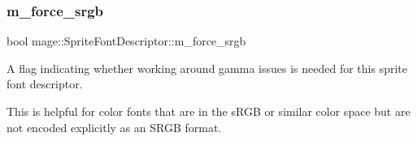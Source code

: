\subsubsection{\texorpdfstring{m\+\_\+force\+\_\+srgb}{m\_force\_srgb}}
{\footnotesize\ttfamily bool mage\+::\+Sprite\+Font\+Descriptor\+::m\+\_\+force\+\_\+srgb\hspace{0.3cm}{\ttfamily [private]}}

A flag indicating whether working around gamma issues is needed for this sprite font descriptor.

This is helpful for color fonts that are in the s\+R\+GB or similar color space but are not encoded explicitly as an S\+R\+GB format. 